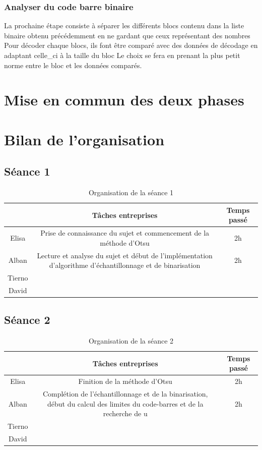 \documentclass{rapport}
\begin{document}
\subsubsection{Analyser du code barre binaire}

La prochaine étape consiste à séparer les différents blocs contenu dans la liste binaire obtenu précédemment en ne gardant que ceux représentant des nombres
Pour décoder chaque blocs, ils font être comparé avec des données de décodage en adaptant celle_ci à la taille du bloc 
Le choix se fera en prenant la plus petit norme entre le bloc et les données comparés. 

\section{Mise en commun des deux phases}

\section{Bilan de l'organisation}

\subsection{Séance 1}

\begin{table}[htbp]
	\centering 
	\begin{tabular}{c|c|c}
		& Tâches entreprises& Temps passé\\ \hline
		Elisa& Prise de connaissance du sujet et commencement de la méthode d'Otsu& 2h\\ \hline
		Alban& Lecture et analyse du sujet et début de l'implémentation d'algorithme d'échantillonnage et de binarisation& 2h\\ \hline
		Tierno& & \\ \hline
		David& & 
	\end{tabular}
	\caption{Organisation de la séance 1}
\end{table}

\subsection{Séance 2}

\begin{table}[htbp]
	\centering 
	\begin{tabular}{c|c|c}
		& Tâches entreprises& Temps passé\\ \hline
		Elisa& Finition de la méthode d'Otsu & 2h\\ \hline
		Alban& Complétion de l'échantillonnage et de la binarisation, début du calcul des limites du code-barres et de la recherche de u& 2h\\ \hline
		Tierno& & \\ \hline
		David& & 
	\end{tabular}
	\caption{Organisation de la séance 2}
\end{table}
\end{document}
